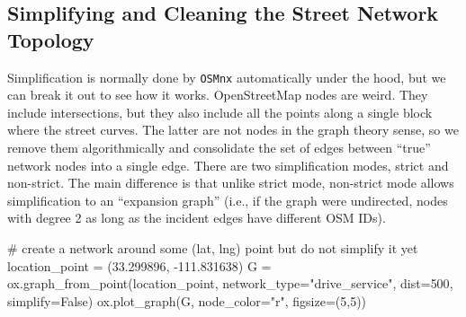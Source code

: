 \documentclass[
  letterpaper,
  DIV=11,
  numbers=noendperiod]{scrreprt}
\newenvironment{Shaded}{\begin{snugshade}}{\end{snugshade}}
\newcommand{\CommentTok}[1]{\textcolor[rgb]{0.37,0.37,0.37}{#1}}
\newcommand{\DecValTok}[1]{\textcolor[rgb]{0.68,0.00,0.00}{#1}}
\newcommand{\FloatTok}[1]{\textcolor[rgb]{0.68,0.00,0.00}{#1}}
\newcommand{\NormalTok}[1]{\textcolor[rgb]{0.00,0.23,0.31}{#1}}
\newcommand{\OperatorTok}[1]{\textcolor[rgb]{0.37,0.37,0.37}{#1}}
\newcommand{\StringTok}[1]{\textcolor[rgb]{0.13,0.47,0.30}{#1}}
\newcommand{\VariableTok}[1]{\textcolor[rgb]{0.07,0.07,0.07}{#1}}
\begin{document}
\hypertarget{simplifying-and-cleaning-the-street-network-topology}{%
\subsection{Simplifying and Cleaning the Street Network
Topology}\label{simplifying-and-cleaning-the-street-network-topology}}

Simplification is normally done by \texttt{OSMnx} automatically under
the hood, but we can break it out to see how it works. OpenStreetMap
nodes are weird. They include intersections, but they also include all
the points along a single block where the street curves. The latter are
not nodes in the graph theory sense, so we remove them algorithmically
and consolidate the set of edges between ``true'' network nodes into a
single edge. There are two simplification modes, strict and non-strict.
The main difference is that unlike strict mode, non-strict mode allows
simplification to an ``expansion graph'' (i.e., if the graph were
undirected, nodes with degree 2 as long as the incident edges have
different OSM IDs).

\begin{Shaded}
\begin{Highlighting}[]
\CommentTok{\# create a network around some (lat, lng) point but do not simplify it yet}
\NormalTok{location\_point }\OperatorTok{=}\NormalTok{ (}\FloatTok{33.299896}\NormalTok{, }\OperatorTok{{-}}\FloatTok{111.831638}\NormalTok{)}
\NormalTok{G }\OperatorTok{=}\NormalTok{ ox.graph\_from\_point(location\_point, network\_type}\OperatorTok{=}\StringTok{"drive\_service"}\NormalTok{, dist}\OperatorTok{=}\DecValTok{500}\NormalTok{, simplify}\OperatorTok{=}\VariableTok{False}\NormalTok{)}
\NormalTok{ox.plot\_graph(G, node\_color}\OperatorTok{=}\StringTok{"r"}\NormalTok{, figsize}\OperatorTok{=}\NormalTok{(}\DecValTok{5}\NormalTok{,}\DecValTok{5}\NormalTok{))}
\end{Highlighting}
\end{Shaded}
\end{document}
